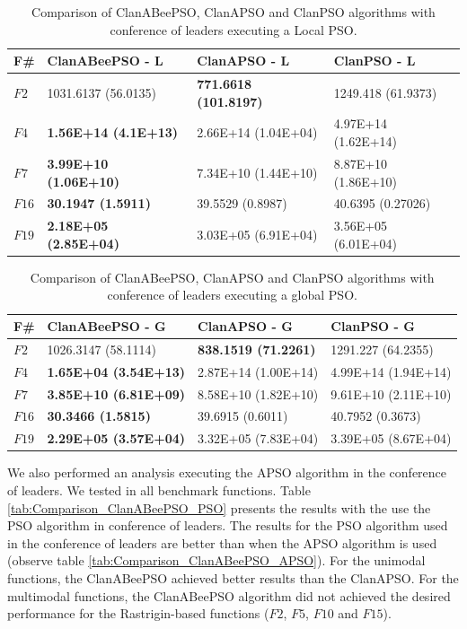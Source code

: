 \begin{table}[!h]
\caption{\small{Comparison of ClanABeePSO, ClanAPSO and ClanPSO algorithms with conference of leaders executing a Local PSO.}}
\centering
\begin{tabular}{p{0.5cm}|p{3.0cm}|p{3.0cm}|p{3.0cm}}
\hline
\textbf{F\#}  & ClanABeePSO - L &  ClanAPSO - L & ClanPSO - L \\
\hline
$F2$      &  1031.6137 (56.0135) &  \textbf{771.6618 (101.8197)}   &  1249.418 (61.9373) \\
$F4$      &  \textbf{1.56E+14 (4.1E+13)}  &  2.66E+14 (1.04E+04)   &  4.97E+14 (1.62E+14) \\
$F7$      &  \textbf{3.99E+10 (1.06E+10)} &  7.34E+10 (1.44E+10)   &  8.87E+10 (1.86E+10) \\
$F16$     &  \textbf{30.1947 (1.5911)}    &  39.5529  (0.8987)     &  40.6395 (0.27026) \\
$F19$     &  \textbf{2.18E+05 (2.85E+04)} &  3.03E+05 (6.91E+04)   &  3.56E+05 (6.01E+04)\\
\hline
\end{tabular}
\label{tab:ClanABeePSO_Local}
\end{table}

\begin{table}[!h]
\caption{\small{Comparison of ClanABeePSO, ClanAPSO and ClanPSO algorithms with conference of leaders executing a global PSO.}}
\centering
\begin{tabular}{p{0.5cm}|p{3.0cm}|p{3.0cm}|p{3.0cm}}
\hline
\textbf{F\#}  & ClanABeePSO - G &  ClanAPSO - G & ClanPSO - G\\
\hline
$F2$      &   1026.3147 (58.1114)   &  \textbf{838.1519 (71.2261)}   & 1291.227 (64.2355) \\
$F4$      &   \textbf{1.65E+04 (3.54E+13)}   &  2.87E+14 (1.00E+14)  & 4.99E+14 (1.94E+14) \\
$F7$      &   \textbf{3.85E+10 (6.81E+09)}   &  8.58E+10 (1.82E+10)    & 9.61E+10 (2.11E+10) \\
$F16$     &   \textbf{30.3466 (1.5815)}      &  39.6915 (0.6011)     &  40.7952 (0.3673)\\
$F19$     &   \textbf{2.29E+05 (3.57E+04)}   &  3.32E+05 (7.83E+04)  & 3.39E+05 (8.67E+04) \\
\hline
\end{tabular}
\label{tab:ClanABeePSO_Global}
\end{table}

We also performed an analysis executing the APSO algorithm in the conference of leaders. We tested in all benchmark functions.
Table \ref{tab:Comparison_ClanABeePSO_PSO} presents the results with the use the PSO algorithm in conference of leaders. The results for the PSO algorithm used in the conference of leaders are better than when the APSO algorithm is used (observe table \ref{tab:Comparison_ClanABeePSO_APSO}). For the unimodal functions, the ClanABeePSO achieved better results than the ClanAPSO. For the multimodal functions, the ClanABeePSO algorithm did not achieved the desired performance for the Rastrigin-based functions ($F2$, $F5$, $F10$ and $F15$).

